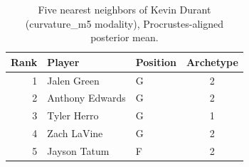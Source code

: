 \begin{table}[htbp]
  \centering\small
  \begin{tabular}{rllc}
    \toprule
    Rank & Player & Position & Archetype \\
    \midrule
    1 & Jalen Green & G & 2 \\
    2 & Anthony Edwards & G & 2 \\
    3 & Tyler Herro & G & 1 \\
    4 & Zach LaVine & G & 2 \\
    5 & Jayson Tatum & F & 2 \\
    \bottomrule
  \end{tabular}
  \caption{Five nearest neighbors of Kevin Durant (curvature_m5 modality), Procrustes-aligned posterior mean.}
  \label{tab:Kevin_Durant_neighbors_curvature_m5}
\end{table}

